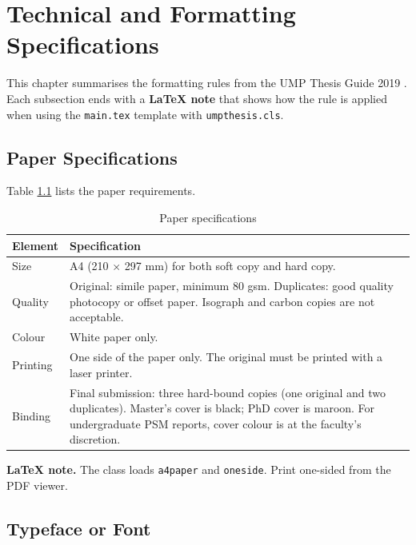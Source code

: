 \chapter{Technical and Formatting Specifications}

This chapter summarises the formatting rules from the UMP Thesis Guide 2019 \citep{umpthesis2019}. Each subsection ends with a \textbf{LaTeX note} that shows how the rule is applied when using the \texttt{main.tex} template with \texttt{umpthesis.cls}.

\section{Paper Specifications}

Table \ref{tab:paperspec} lists the paper requirements.

\begin{table}[htbp]
\caption{Paper specifications}
\label{tab:paperspec}
\begin{tabularx}{\textwidth}{@{} l X @{}}
\toprule
Element & Specification \\
\midrule
Size & A4 (210 $\times$ 297 mm) for both soft copy and hard copy. \\
Quality & Original: simile paper, minimum 80 gsm. Duplicates: good quality photocopy or offset paper. Isograph and carbon copies are not acceptable. \\
Colour & White paper only. \\
Printing & One side of the paper only. The original must be printed with a laser printer. \\
Binding & Final submission: three hard-bound copies (one original and two duplicates). Master's cover is black; PhD cover is maroon. For undergraduate PSM reports, cover colour is at the faculty's discretion. \\
\bottomrule
\end{tabularx}
\end{table}

\textbf{LaTeX note.} The class loads \texttt{a4paper} and \texttt{oneside}. Print one-sided from the PDF viewer.

\section{Typeface or Font}

